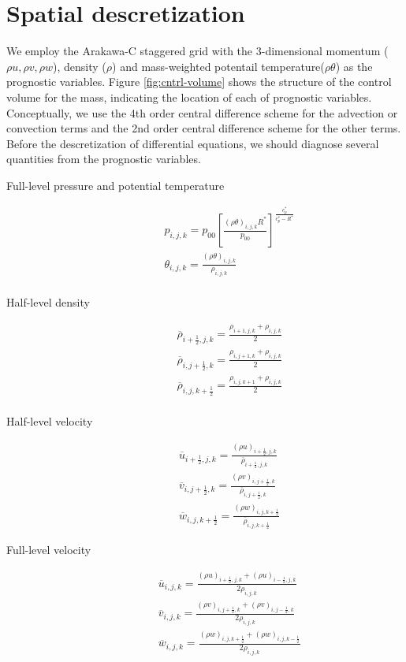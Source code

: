 \section{Spatial descretization}
We employ the Arakawa-C staggered grid with the 3-dimensional momentum 
($\rho u, \rho v, \rho w$), density ($\rho$) and mass-weighted potentail temperature($\rho \theta$)
as the prognostic variables.
Figure \ref{fig:cntrl-volume} shows the structure of the control volume for the mass,
indicating the location of each of prognostic variables.
Conceptually, we use the 4th order central difference scheme 
for the advection or convection terms and
the 2nd order central difference scheme for the other terms.
Before the descretization of differential equations,
we should diagnose several quantities from the prognostic variables.
\begin{description}
\item[Full-level pressure and potential temperature]
\begin{eqnarray}
&&p_{i,j,k}=p_{00}\left[\frac{(\rho \theta)_{i,j,k} R^*}{p_{00}} \right]^{\frac{c_{p}^*}{c_{p}^*- R^*}}\\
&&\theta_{i,j,k} = \frac{(\rho \theta)_{i,j,k}}{\rho_{i,j,k}}\\
\end{eqnarray}
\item[Half-level density]
\begin{eqnarray}
&&  \overline{\rho}_{i+\frac{1}{2},j,k} = \frac{\rho_{i+1,j,k}+\rho_{i,j,k}}{2}\\
&&  \overline{\rho}_{i,j+\frac{1}{2},k} = \frac{\rho_{i,j+1,k}+\rho_{i,j,k}}{2}\\
&&  \overline{\rho}_{i,j,k+\frac{1}{2}} = \frac{\rho_{i,j,k+1}+\rho_{i,j,k}}{2}\\
\end{eqnarray}
\item[Half-level velocity]
\begin{eqnarray}
&&  \overline{u}_{i+\frac{1}{2},j,k} = \frac{(\rho u)_{i+\frac{1}{2},j,k}}{\overline{\rho}_{i+\frac{1}{2},j,k}}\\
&&  \overline{v}_{i,j+\frac{1}{2},k} = \frac{(\rho v)_{i,j+\frac{1}{2},k}}{\overline{\rho}_{i,j+\frac{1}{2},k}}\\
&&  \overline{w}_{i,j,k+\frac{1}{2}} = \frac{(\rho w)_{i,j,k+\frac{1}{2}}}{\overline{\rho}_{i,j,k+\frac{1}{2}}}
\end{eqnarray}
\item[Full-level velocity]
\begin{eqnarray}
&&  \overline{u}_{i,j,k} = \frac{(\rho u)_{i+\frac{1}{2},j,k}+(\rho u)_{i-\frac{1}{2},j,k}}{2\rho_{i,j,k}}\\
&&  \overline{v}_{i,j,k} = \frac{(\rho v)_{i,j+\frac{1}{2},k}+(\rho v)_{i,j-\frac{1}{2},k}}{2\rho_{i,j,k}}\\
&&  \overline{w}_{i,j,k} = \frac{(\rho w)_{i,j,k+\frac{1}{2}}+(\rho w)_{i,j,k-\frac{1}{2}}}{2\rho_{i,j,k}}
\end{eqnarray}
\end{description}




